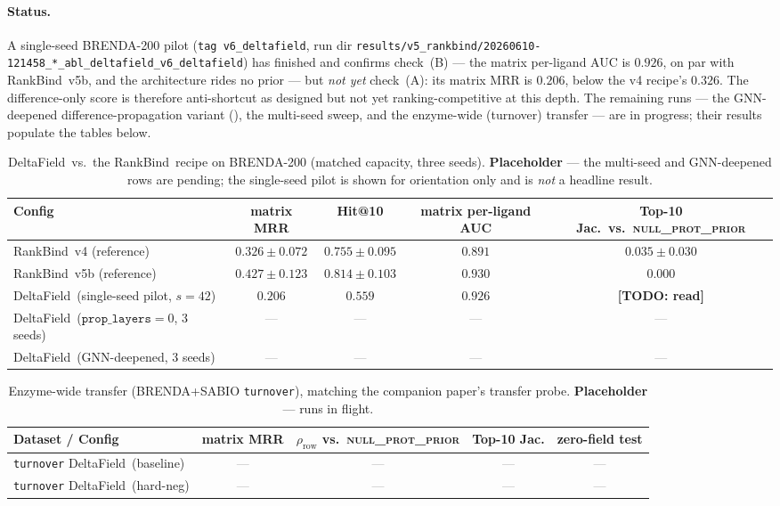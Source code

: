 \documentclass[11pt,a4paper]{article}
\newcommand{\df}{DeltaField\xspace}
\newcommand{\method}{RankBind\xspace}
\newcommand{\nullprior}{\textsc{null\_prot\_prior}\xspace}
\newcommand{\plauc}{per-ligand AUC}
\newcommand{\TODO}[1]{\textcolor{red!80!black}{\textbf{[TODO: #1]}}}
\newcommand{\pending}{\textcolor{gray}{---}}
\begin{document}
\paragraph{Status.}
A single-seed BRENDA-200 pilot (\texttt{tag v6\_deltafield}, run dir
\texttt{results/v5\_rankbind/20260610-121458\_*\_abl\_deltafield\_v6\_deltafield})
has finished and confirms check~(B) --- the matrix per-ligand AUC is
$0.926$, on par with \method\ v5b, and the architecture rides no prior --- but
\emph{not yet} check~(A): its matrix MRR is $0.206$, below the v4 recipe's
$0.326$. The difference-only score is therefore anti-shortcut as designed but
not yet ranking-competitive at this depth. The remaining runs --- the
GNN-deepened difference-propagation variant (), the multi-seed
sweep, and the enzyme-wide (turnover) transfer --- are in progress; their
results populate the tables below.

\begin{table}[h]
  \centering
  \footnotesize
  \setlength{\tabcolsep}{6pt}
  \caption{\df\ vs.\ the \method\ recipe on BRENDA-200 (matched capacity,
  three seeds). \textbf{Placeholder} --- the multi-seed and GNN-deepened rows
  are pending; the single-seed pilot is shown for orientation only and is
  \emph{not} a headline result.}
  \label{tab:headline}
  \begin{tabular}{lcccc}
    \toprule
    Config & matrix MRR & Hit@10 & matrix \plauc & Top-10 Jac.\ vs.\ \nullprior \\
    \midrule
    \method\ v4 (reference)            & $0.326\pm0.072$ & $0.755\pm0.095$ & $0.891$ & $0.035\pm0.030$ \\
    \method\ v5b (reference)           & $0.427\pm0.123$ & $0.814\pm0.103$ & $0.930$ & $0.000$ \\
    \midrule
    \df\ (single-seed pilot, $s{=}42$) & $0.206$         & $0.559$         & $0.926$ & \TODO{read} \\
    \df\ ($\texttt{prop\_layers}{=}0$, 3 seeds) & \pending & \pending & \pending & \pending \\
    \df\ (GNN-deepened, 3 seeds)       & \pending & \pending & \pending & \pending \\
    \bottomrule
  \end{tabular}
\end{table}

\begin{table}[h]
  \centering
  \footnotesize
  \setlength{\tabcolsep}{6pt}
  \caption{Enzyme-wide transfer (BRENDA+SABIO \texttt{turnover}), matching the
  companion paper's transfer probe. \textbf{Placeholder} --- runs in flight.}
  \label{tab:transfer}
  \begin{tabular}{lcccc}
    \toprule
    Dataset / Config & matrix MRR & $\rho_{\text{row}}$ vs.\ \nullprior & Top-10 Jac. & zero-field test \\
    \midrule
    \texttt{turnover} \df\ (baseline) & \pending & \pending & \pending & \pending \\
    \texttt{turnover} \df\ (hard-neg) & \pending & \pending & \pending & \pending \\
    \bottomrule
  \end{tabular}
\end{table}
\end{document}
